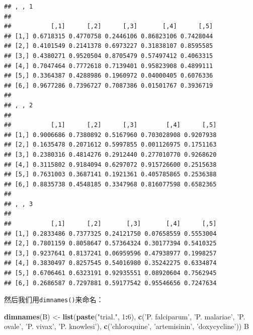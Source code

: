 \documentclass[]{book}
\newenvironment{Shaded}{\begin{snugshade}}{\end{snugshade}}
\newcommand{\DecValTok}[1]{\textcolor[rgb]{0.00,0.00,0.81}{#1}}
\newcommand{\KeywordTok}[1]{\textcolor[rgb]{0.13,0.29,0.53}{\textbf{#1}}}
\newcommand{\NormalTok}[1]{#1}
\newcommand{\OperatorTok}[1]{\textcolor[rgb]{0.81,0.36,0.00}{\textbf{#1}}}
\newcommand{\StringTok}[1]{\textcolor[rgb]{0.31,0.60,0.02}{#1}}
\begin{document}
\begin{verbatim}
## , , 1
## 
##           [,1]      [,2]      [,3]       [,4]      [,5]
## [1,] 0.6718315 0.4770758 0.2446106 0.86823106 0.7428044
## [2,] 0.4101549 0.2141378 0.6973227 0.31838107 0.8595585
## [3,] 0.4380271 0.9520504 0.8705479 0.57497412 0.4063315
## [4,] 0.7047464 0.7772618 0.7139401 0.95823908 0.4899111
## [5,] 0.3364387 0.4288986 0.1960972 0.04000405 0.6076336
## [6,] 0.9677286 0.7396727 0.7087386 0.01501767 0.3936719
## 
## , , 2
## 
##           [,1]      [,2]      [,3]        [,4]      [,5]
## [1,] 0.9006686 0.7380892 0.5167960 0.703028908 0.9207938
## [2,] 0.1635478 0.2071612 0.5997855 0.001126975 0.1751163
## [3,] 0.2380316 0.4814276 0.2912440 0.277010770 0.9268620
## [4,] 0.3115802 0.9184094 0.6297072 0.915726600 0.2515638
## [5,] 0.7631003 0.3687141 0.1921361 0.405785865 0.2536388
## [6,] 0.8835738 0.4548185 0.3347968 0.816077598 0.6582365
## 
## , , 3
## 
##           [,1]      [,2]       [,3]       [,4]      [,5]
## [1,] 0.2833486 0.7377325 0.24121750 0.07658559 0.5553004
## [2,] 0.7801159 0.8058647 0.57364324 0.30177394 0.5410325
## [3,] 0.9237641 0.8137241 0.06959596 0.47938977 0.1998257
## [4,] 0.3830497 0.8257545 0.54016980 0.35242275 0.6334874
## [5,] 0.6706461 0.6323191 0.92935551 0.08920604 0.7562945
## [6,] 0.2686587 0.7297881 0.59177542 0.95546656 0.7247634
\end{verbatim}

然后我们用\texttt{dimnames()}来命名：

\begin{Shaded}
\begin{Highlighting}[]
\KeywordTok{dimnames}\NormalTok{(B) <-}\StringTok{ }\KeywordTok{list}\NormalTok{(}\KeywordTok{paste}\NormalTok{(}\StringTok{"trial."}\NormalTok{, }\DecValTok{1}\OperatorTok{:}\DecValTok{6}\NormalTok{), }\KeywordTok{c}\NormalTok{(}\StringTok{'P. falciparum'}\NormalTok{, }\StringTok{'P. malariae'}\NormalTok{, }\StringTok{'P. ovale'}\NormalTok{, }\StringTok{'P. vivax'}\NormalTok{, }\StringTok{'P. knowlesi'}\NormalTok{), }\KeywordTok{c}\NormalTok{(}\StringTok{'chloroquine'}\NormalTok{, }\StringTok{'artemisinin'}\NormalTok{, }\StringTok{'doxycycline'}\NormalTok{))}
\NormalTok{B}
\end{Highlighting}
\end{Shaded}
\end{document}
